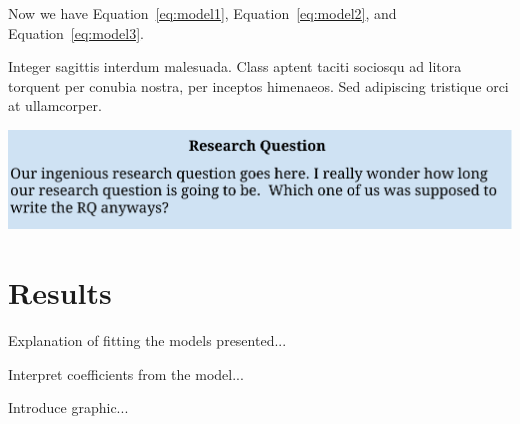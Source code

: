\documentclass[a0,landscape]{a0poster}
\begin{document}
\begin{multicols}{3}
Now we have Equation~\ref{eq:model1},
Equation~\ref{eq:model2}, and
Equation~\ref{eq:model3}.

Integer sagittis interdum malesuada. Class aptent taciti sociosqu ad litora torquent per conubia nostra, per inceptos himenaeos. Sed adipiscing tristique orci at ullamcorper.

\begin{center}\vspace{1cm}
\includegraphics[width=1.0\linewidth]{ResearchQuestion.pdf}
\end{center}\vspace{1cm}


\color{NavyBlue}

\section*{Results}

Explanation of fitting the models presented...
%
\color{Black}
\begin{center}\vspace{1cm}

\end{center}\vspace{1cm}
\color{NavyBlue}
%   

Interpret coefficients from the model...

\color{NavyBlue}

Introduce graphic...


\end{multicols}
\end{document}
